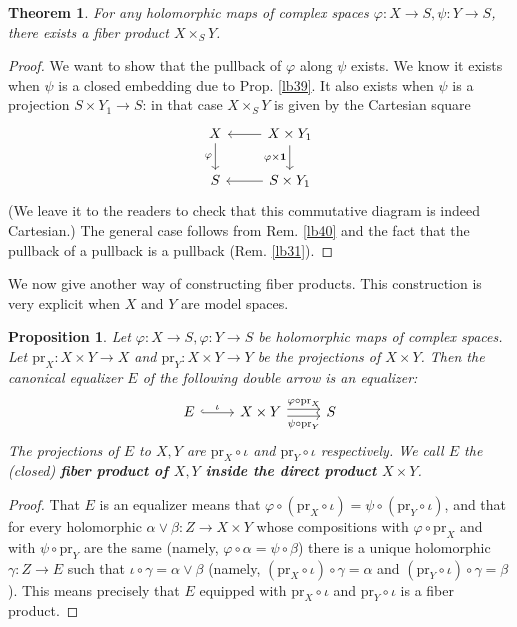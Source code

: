 \documentclass[12pt,b5paper,notitlepage]{report}
\theoremstyle{definition}
\theoremstyle{plain}
\newtheorem{thm}[df]{Theorem}
\newtheorem{pp}[df]{Proposition}
\newcommand{\id}{\mathbf{1}}
\newcommand{\pr}{\mathrm {pr}}
\numberwithin{equation}{section}
\begin{document}
\begin{thm}
For any holomorphic maps of complex spaces $\varphi:X\rightarrow S,\psi:Y\rightarrow S$, there exists a fiber product $X\times_SY$.
\end{thm}
\begin{proof}
We want to show that the pullback of $\varphi$ along $\psi$ exists. We know it exists when $\psi$ is a closed embedding due to Prop. \ref{lb39}. It also exists when $\psi$ is a projection $S\times Y_1\rightarrow S$: in that case $X\times_SY$ is given by the Cartesian square
\begin{equation}
\begin{tikzcd}
X \arrow[d, "\varphi"'] & X\times Y_1 \arrow[l] \arrow[d, "\varphi\times\id"'] \\
S                       & S\times Y_1 \arrow[l]                               
\end{tikzcd}
\end{equation}
(We leave it to the readers to check that this commutative diagram is indeed Cartesian.) The general case follows from Rem. \ref{lb40} and the fact that the pullback of a pullback is a pullback (Rem. \ref{lb31}).
\end{proof}



We now give another way of constructing fiber products. This construction is very explicit when $X$ and $Y$ are model spaces.


\begin{pp}
Let $\varphi:X\rightarrow S,\varphi:Y\rightarrow S$ be holomorphic maps of complex spaces. Let $\pr_X:X\times Y\rightarrow X$ and $\pr_Y:X\times Y\rightarrow Y$ be the projections of $X\times Y$. Then the canonical equalizer $E$ of the following double arrow is an equalizer:
\begin{equation}
\begin{tikzcd}
E \arrow[r,hook,"\iota"] & X\times Y \arrow[r, shift left, "\varphi\circ\pr_X"] \arrow[r, shift right, "\psi\circ\pr_Y"'] & S
\end{tikzcd}
\end{equation}
The projections of $E$ to $X,Y$ are $\pr_X\circ\iota$ and $\pr_Y\circ\iota$ respectively. We call $E$ the (closed) \textbf{fiber product of $X,Y$ inside the direct product $X\times Y$}. 
\end{pp}


\begin{proof}
That $E$ is an equalizer means that $\varphi\circ(\pr_X\circ\iota)=\psi\circ(\pr_Y\circ\iota)$, and that for every holomorphic $\alpha\vee\beta:Z\rightarrow X\times Y$ whose compositions with $\varphi\circ\pr_X$ and with $\psi\circ\pr_Y$ are the same (namely, $\varphi\circ\alpha=\psi\circ\beta$) there is a unique holomorphic $\gamma:Z\rightarrow E$ such that $\iota\circ\gamma=\alpha\vee\beta$ (namely, $(\pr_X\circ\iota)\circ\gamma=\alpha$ and $(\pr_Y\circ\iota)\circ\gamma=\beta$). This means precisely that $E$ equipped with $\pr_X\circ\iota$ and $\pr_Y\circ\iota$ is a fiber product. 
\end{proof}
\end{document}
